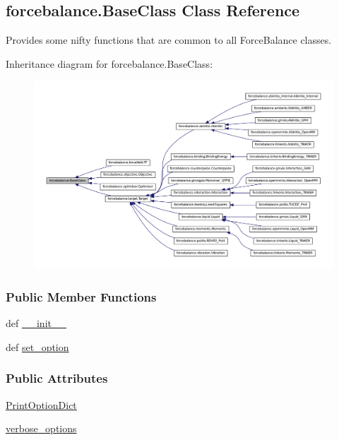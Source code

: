 \hypertarget{classforcebalance_1_1BaseClass}{\subsection{forcebalance.\-Base\-Class \-Class \-Reference}
\label{classforcebalance_1_1BaseClass}
}


\-Provides some nifty functions that are common to all \-Force\-Balance classes.  




\-Inheritance diagram for forcebalance.\-Base\-Class\-:\nopagebreak
\begin{figure}[H]
\begin{center}
\leavevmode
\includegraphics[width=350pt]{classforcebalance_1_1BaseClass__inherit__graph}
\end{center}
\end{figure}
\subsubsection*{\-Public \-Member \-Functions}
\begin{DoxyCompactItemize}
\item 
def \hyperlink{classforcebalance_1_1BaseClass_ab395e00d6714b12c4b2d2ffeaa523772}{\-\_\-\-\_\-init\-\_\-\-\_\-}
\item 
def \hyperlink{classforcebalance_1_1BaseClass_a73e9a37a7632e79eb99f49bd15aced45}{set\-\_\-option}
\end{DoxyCompactItemize}
\subsubsection*{\-Public \-Attributes}
\begin{DoxyCompactItemize}
\item 
\hyperlink{classforcebalance_1_1BaseClass_afc6659278497d7245bc492ecf405ccae}{\-Print\-Option\-Dict}
\item 
\hyperlink{classforcebalance_1_1BaseClass_afd68efa29ccd2f320f4cf82198214aac}{verbose\-\_\-options}
\end{DoxyCompactItemize}


